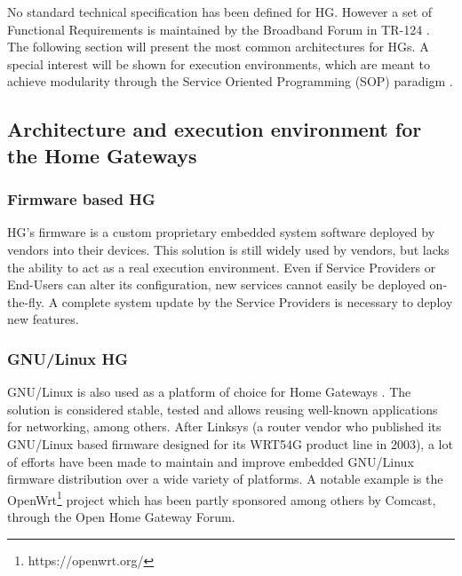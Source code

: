  
No standard technical specification has been defined for HG. However a set of Functional Requirements is maintained by the Broadband Forum in TR-124 \cite{broadband_forum_functional_2014}.
The following section will present the most common architectures for HGs.
A special interest will be shown for execution environments, which are meant to achieve modularity through the Service Oriented Programming (SOP) paradigm \cite{bieber2001introduction}.


\subsection{Architecture and execution environment for the Home Gateways}

\subsubsection{Firmware based HG}
HG's firmware is a custom proprietary embedded system software deployed by vendors into their devices.
This solution is still widely used by vendors, but lacks the ability to act as a real execution environment.
Even if Service Providers or End-Users can alter its configuration, new services cannot easily be deployed on-the-fly.
A complete system update by the Service Providers is necessary to deploy new features.
   
\subsubsection{GNU/Linux HG}
   
GNU/Linux is also used as a platform of choice for Home Gateways \cite{royon_multiservice_2007}.
The solution is considered stable, tested and allows reusing well-known applications for networking, among others.
After Linksys (a router vendor who published its GNU/Linux based firmware designed for its WRT54G product line in 2003), a lot of efforts have been made to maintain and improve embedded GNU/Linux firmware distribution over a wide variety of platforms.
A notable example is the OpenWrt\footnote{https://openwrt.org/} project which has been partly sponsored among others by Comcast, through the Open Home Gateway Forum.

